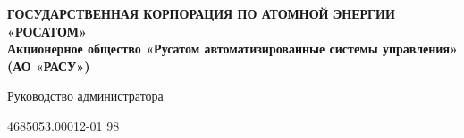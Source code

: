 \documentclass[12pt,cmcyralt]{article}
\begin{document}
 

\begin{titlepage}                                                         
    \newpage                                                                        
    \begin{center}                                                        
    {\bfseries ГОСУДАРСТВЕННАЯ КОРПОРАЦИЯ ПО АТОМНОЙ ЭНЕРГИИ «РОСАТОМ» \\
    Акционерное общество «Русатом автоматизированные системы управления» (АО «РАСУ»)}                               
    \vspace{1cm}                                                          
                                                                                        
    Руководство администратора                                                              
    \vspace{6em}                                                          
                                                                                        
                                                                                        
                                                                                        
                                                                                        
     4685053.00012-01 98 \\                                                      
    \end{center}                                                          
                                                                                        

\end{titlepage}
\end{document}
